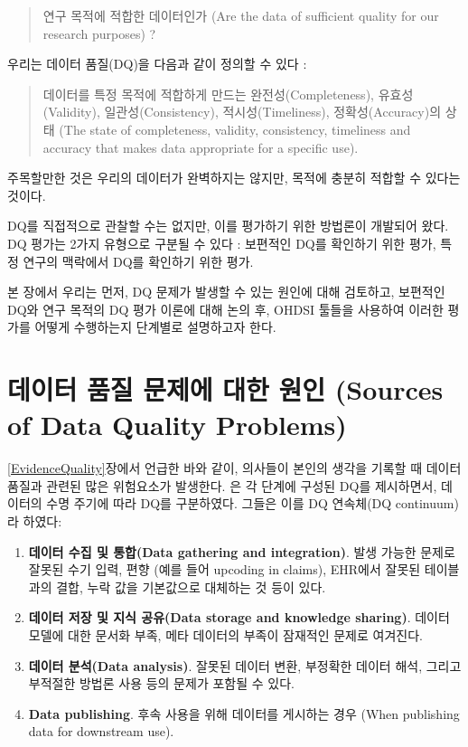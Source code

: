 \documentclass[11pt]{book}
\providecommand{\tightlist}{%
  \setlength{\itemsep}{0pt}\setlength{\parskip}{0pt}}
\theoremstyle{definition}
\theoremstyle{definition}
\theoremstyle{definition}
\theoremstyle{remark}
\begin{document}
\begin{quote}
연구 목적에 적합한 데이터인가 (Are the data of sufficient quality for
our research purposes) ?
\end{quote}

우리는 데이터 품질(DQ)을 다음과 같이 정의할 수 있다
\citep{roebuck_2012}: 

\begin{quote}
데이터를 특정 목적에 적합하게 만드는 완전성(Completeness),
유효성(Validity), 일관성(Consistency), 적시성(Timeliness),
정확성(Accuracy)의 상태 (The state of completeness, validity,
consistency, timeliness and accuracy that makes data appropriate for a
specific use).
\end{quote}

주목할만한 것은 우리의 데이터가 완벽하지는 않지만, 목적에 충분히 적합할
수 있다는 것이다.

DQ를 직접적으로 관찰할 수는 없지만, 이를 평가하기 위한 방법론이 개발되어
왔다. DQ 평가는 2가지 유형으로 구분될 수 있다 \citep{weiskopf_2013}:
보편적인 DQ를 확인하기 위한 평가, 특정 연구의 맥락에서 DQ를 확인하기
위한 평가.

본 장에서 우리는 먼저, DQ 문제가 발생할 수 있는 원인에 대해 검토하고,
보편적인 DQ와 연구 목적의 DQ 평가 이론에 대해 논의 후, OHDSI 툴들을
사용하여 이러한 평가를 어떻게 수행하는지 단계별로 설명하고자 한다.

\section{데이터 품질 문제에 대한 원인 (Sources of Data Quality
Problems)}\label{-----sources-of-data-quality-problems}

\ref{EvidenceQuality}장에서 언급한 바와 같이, 의사들이 본인의 생각을
기록할 때 데이터 품질과 관련된 많은 위험요소가 발생한다.
\citet{dasu_2003} 은 각 단계에 구성된 DQ를 제시하면서, 데이터의 수명
주기에 따라 DQ를 구분하였다. 그들은 이를 DQ 연속체(DQ continuum)라
하였다:

\begin{enumerate}
\def\labelenumi{\arabic{enumi}.}
\tightlist
\item
  \textbf{데이터 수집 및 통합(Data gathering and integration)}. 발생
  가능한 문제로 잘못된 수기 입력, 편향 (예를 들어 upcoding in claims),
  EHR에서 잘못된 테이블과의 결합, 누락 값을 기본값으로 대체하는 것 등이
  있다.
\item
  \textbf{데이터 저장 및 지식 공유(Data storage and knowledge sharing)}.
  데이터 모델에 대한 문서화 부족, 메타 데이터의 부족이 잠재적인 문제로
  여겨진다.
\item
  \textbf{데이터 분석(Data analysis)}. 잘못된 데이터 변환, 부정확한
  데이터 해석, 그리고 부적절한 방법론 사용 등의 문제가 포함될 수 있다.\\
\item
  \textbf{Data publishing}. 후속 사용을 위해 데이터를 게시하는 경우
  (When publishing data for downstream use).
\end{enumerate}
\end{document}

